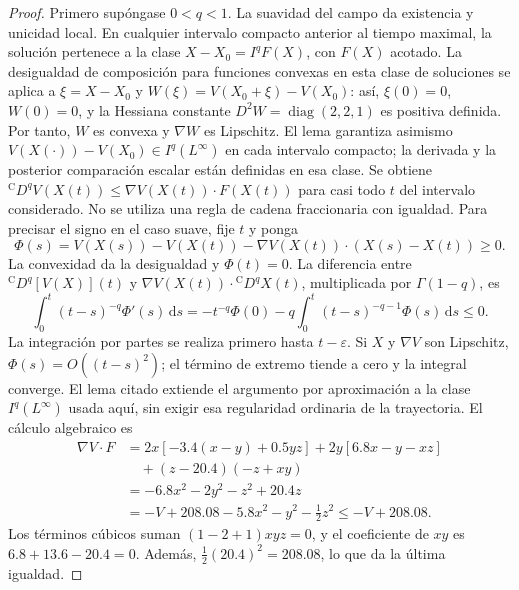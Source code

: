 \begin{proof}
Primero supóngase \(0<q<1\). La suavidad del campo da existencia y unicidad
local. En cualquier intervalo
compacto anterior al tiempo maximal, la solución pertenece a la clase
\(X-X_0=I^qF(X)\), con \(F(X)\) acotado. La desigualdad de composición
para funciones convexas en esta clase de soluciones
\cite[Lema~3.1]{Gomoyunov2018Convex} se aplica a
\(\xi=X-X_0\) y \(W(\xi)=V(X_0+\xi)-V(X_0)\): así,
\(\xi(0)=0\), \(W(0)=0\), y la Hessiana constante
\(D^2W=\operatorname{diag}(2,2,1)\) es positiva definida.
Por tanto, \(W\) es convexa y \(\nabla W\) es Lipschitz.
El lema garantiza asimismo
\(V(X(\cdot))-V(X_0)\in I^q(L^\infty)\) en cada intervalo compacto;
la derivada y la posterior comparación escalar están definidas en esa clase.
Se obtiene
\({}^{\mathrm C}D^qV(X(t))\leq\nabla V(X(t))\cdot F(X(t))\)
para casi todo \(t\) del intervalo considerado.
No se utiliza una regla de cadena fraccionaria con igualdad. Para precisar
el signo en el caso suave, fije $t$ y ponga
\[
 \Phi(s)=V(X(s))-V(X(t))-\nabla V(X(t))\cdot(X(s)-X(t))\ge0.
\]
La convexidad da la desigualdad y $\Phi(t)=0$. La diferencia entre
${}^{\mathrm C}D^q[V(X)](t)$ y
$\nabla V(X(t))\cdot{}^{\mathrm C}D^qX(t)$, multiplicada por
$\Gamma(1-q)$, es
\[
 \int_0^t(t-s)^{-q}\Phi'(s)\,\mathrm ds
 =-t^{-q}\Phi(0)-q\int_0^t(t-s)^{-q-1}\Phi(s)\,\mathrm ds\le0.
\]
La integración por partes se realiza primero hasta $t-\varepsilon$.
Si $X$ y $\nabla V$ son Lipschitz, $\Phi(s)=O((t-s)^2)$;
el término de extremo tiende a cero y la integral converge.
El lema citado extiende el argumento por aproximación a la clase
$I^q(L^\infty)$ usada aquí, sin exigir esa regularidad ordinaria de la
trayectoria. El cálculo algebraico es
\begin{align}
 \nabla V\cdot F
 &=2x[-3.4(x-y)+0.5yz]
   +2y[6.8x-y-xz]\nonumber\\
 &\quad +(z-20.4)(-z+xy)\nonumber\\
 &=-6.8x^2-2y^2-z^2+20.4z\nonumber\\
 &=-V+208.08-5.8x^2-y^2-\tfrac12z^2
 \leq -V+208.08.
 \label{eq:geofo-lorenz-dissipation}
\end{align}
Los términos cúbicos suman \((1-2+1)xyz=0\), y el coeficiente de
\(xy\) es \(6.8+13.6-20.4=0\). Además,
\(\tfrac12(20.4)^2=208.08\), lo que da la última igualdad.


\end{proof}
